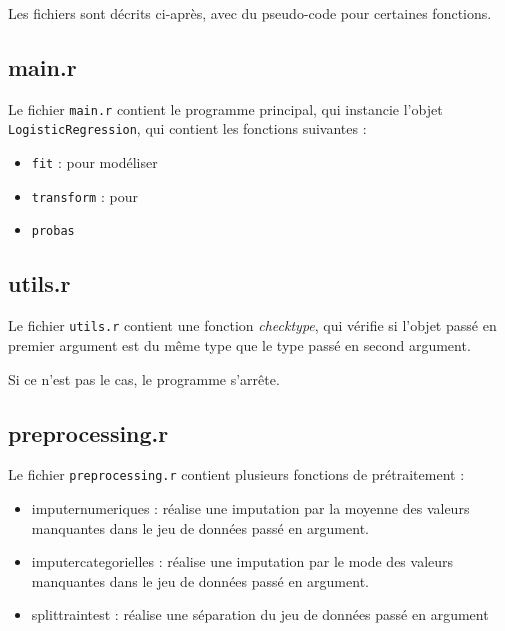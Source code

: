 \documentclass[10pt,french]{report}
\begin{document}

	Les fichiers sont décrits ci-après, avec du pseudo-code pour certaines fonctions.

	\subsection{main.r}

	Le fichier \texttt{main.r} contient le programme principal, qui instancie l'objet \texttt{LogisticRegression}, qui contient les fonctions suivantes :

	\begin{itemize}
		\item \texttt{fit} : pour modéliser
		\item \texttt{transform} : pour
		\item \texttt{probas}
	\end{itemize}

	\subsection{utils.r}

	Le fichier \texttt{utils.r} contient une fonction \textit{check\textunderscore type}, qui vérifie si l'objet passé en premier argument est du même type que le type passé en second argument.

	Si ce n'est pas le cas, le programme s'arrête.

	\subsection{preprocessing.r}

	Le fichier \texttt{preprocessing.r} contient plusieurs fonctions de prétraitement :

	\begin{itemize}
		\item imputer\textunderscore numeriques : réalise une imputation par la moyenne des valeurs manquantes dans le jeu de données passé en argument.
		\item imputer\textunderscore categorielles : réalise une imputation par le mode des valeurs manquantes dans le jeu de données passé en argument.
		\item split\textunderscore train\textunderscore test : réalise une séparation du jeu de données passé en argument
	\end{itemize}
\end{document}
